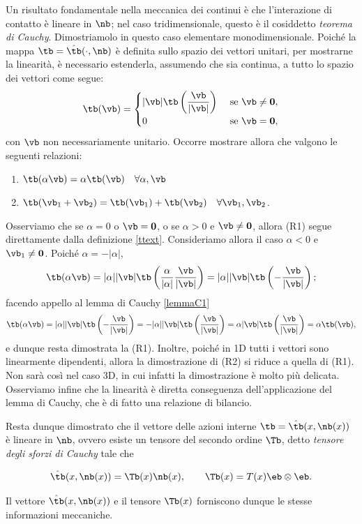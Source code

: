 Un risultato fondamentale nella meccanica dei continui è che l'interazione di contatto è lineare in $\nb$; nel caso tridimensionale, questo è il cosiddetto \textit{teorema di Cauchy}. Dimostriamolo in questo caso elementare monodimensionale. Poiché la mappa $\tb=\hat{\tb}(\cdot, \nb)$ è definita sullo spazio dei vettori unitari, per mostrarne la linearità, è necessario estenderla, assumendo che sia continua,  a tutto lo spazio dei vettori come segue:
\begin{equation}\label{ttext}
	\tb(\vb)=
	\begin{cases}|\vb|\tb\left(\dfrac{\vb}{|\vb|}\right)&\mathrm{~se~}\vb\neq\mathbf{0},\\[.2cm]
		0&\mathrm{~se~}\vb=\mathbf{0},
	\end{cases}
\end{equation}
con $\vb$ non necessariamente unitario. Occorre mostrare allora che valgono le seguenti relazioni:
\begin{enumerate}[label=(R\arabic*)]
	\item $\tb(\alpha \vb)=\alpha\tb(\vb) \quad \forall \alpha, \vb$
	\item $\tb(\vb_1+\vb_2)=\tb(\vb_1)+\tb(\vb_2) \quad \forall \vb_1,\vb_2$.
\end{enumerate}
Osserviamo che se $\alpha=0$ o $\vb =\mathbf{0}$, o se $\alpha>0$ e $\vb \neq \mathbf{0}$, allora (R1) segue direttamente dalla definizione \eqref{ttext}. Consideriamo allora il caso $\alpha<0$ e $\vb_1\neq\mathbf{0}$. Poiché $\alpha=-|\alpha|$,
\begin{equation}
\tb(\alpha \vb)=|\alpha||\vb|\tb\left( \frac{\alpha}{|\alpha|}\frac{\vb}{|\vb|} \right)=|\alpha||\vb|\tb\left(-\frac{\vb}{|\vb|} \right);
\end{equation}
facendo appello al lemma di Cauchy \eqref{lemmaC1}
\begin{equation}
	\tb(\alpha \vb)=|\alpha||\vb|\tb\left(-\frac{\vb}{|\vb|} \right)=-|\alpha||\vb|\tb\left(\frac{\vb}{|\vb|} \right)=\alpha|\vb|\tb\left(\frac{\vb}{|\vb|} \right)=\alpha \tb(\vb),
\end{equation}
e dunque resta dimostrata la (R1). Inoltre, poiché in 1D tutti i vettori sono linearmente dipendenti, allora la dimostrazione di (R2) si riduce a quella di (R1). Non sarà così nel caso 3D, in cui infatti la dimostrazione è molto più delicata. Osserviamo infine che la linearità è diretta conseguenza dell'applicazione del lemma di Cauchy, che è di fatto una relazione di bilancio. 


Resta dunque dimostrato che il vettore delle azioni interne $\tb=\hat{\tb}(x,\nb(x))$ è lineare in $\nb$, ovvero esiste un tensore del secondo ordine $\Tb$, detto \textit{tensore degli sforzi di Cauchy} tale che
\begin{definition}
	\begin{equation}
\hat{\tb}(x,\nb(x))=\Tb(x)\nb(x), \qquad \Tb(x)=T(x) \eb \otimes \eb.
\end{equation}
\end{definition}
Il vettore $\hat{\tb}(x,\nb(x))$ e il tensore $\Tb(x)$ forniscono dunque le stesse informazioni meccaniche.


